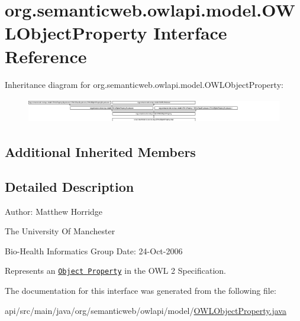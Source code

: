 \hypertarget{interfaceorg_1_1semanticweb_1_1owlapi_1_1model_1_1_o_w_l_object_property}{\section{org.\-semanticweb.\-owlapi.\-model.\-O\-W\-L\-Object\-Property Interface Reference}
\label{interfaceorg_1_1semanticweb_1_1owlapi_1_1model_1_1_o_w_l_object_property}
}
Inheritance diagram for org.\-semanticweb.\-owlapi.\-model.\-O\-W\-L\-Object\-Property\-:\begin{figure}[H]
\begin{center}
\leavevmode
\includegraphics[height=1.109460cm]{interfaceorg_1_1semanticweb_1_1owlapi_1_1model_1_1_o_w_l_object_property}
\end{center}
\end{figure}
\subsection*{Additional Inherited Members}


\subsection{Detailed Description}
Author\-: Matthew Horridge\par
 The University Of Manchester\par
 Bio-\/\-Health Informatics Group Date\-: 24-\/\-Oct-\/2006 

Represents an \href{http://www.w3.org/TR/2009/REC-owl2-syntax-20091027/#Object_Properties}{\tt Object Property} in the O\-W\-L 2 Specification. 

The documentation for this interface was generated from the following file\-:\begin{DoxyCompactItemize}
\item 
api/src/main/java/org/semanticweb/owlapi/model/\hyperlink{_o_w_l_object_property_8java}{O\-W\-L\-Object\-Property.\-java}\end{DoxyCompactItemize}
